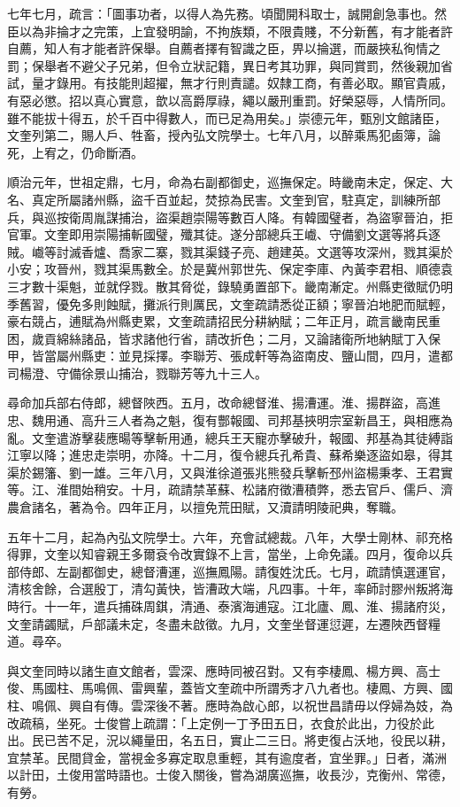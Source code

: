 \begin{pinyinscope}
七年七月，疏言：「圖事功者，以得人為先務。頃聞開科取士，誠開創急事也。然臣以為非掄才之完策，上宜發明諭，不拘族類，不限貴賤，不分新舊，有才能者許自薦，知人有才能者許保舉。自薦者擇有智識之臣，畀以掄選，而嚴挾私徇情之罰；保舉者不避父子兄弟，但令立狀記籍，異日考其功罪，與同賞罰，然後親加省試，量才錄用。有技能則超擢，無才行則責譴。奴隸工商，有善必取。顯官貴戚，有惡必懲。招以真心實意，歆以高爵厚祿，繩以嚴刑重罰。好榮惡辱，人情所同。雖不能拔十得五，於千百中得數人，而已足為用矣。」崇德元年，甄別文館諸臣，文奎列第二，賜人戶、牲畜，授內弘文院學士。七年八月，以醉乘馬犯鹵簿，論死，上宥之，仍命斷酒。

順治元年，世祖定鼎，七月，命為右副都御史，巡撫保定。時畿南未定，保定、大名、真定所屬諸州縣，盜千百並起，焚掠為民害。文奎到官，駐真定，訓練所部兵，與巡按衛周胤謀捕治，盜渠趙崇陽等數百人降。有韓國璧者，為盜寧晉泊，拒官軍。文奎即用崇陽捕斬國璧，殲其徒。遂分部總兵王巇、守備劉文選等將兵逐賊。巇等討滅香爐、喬家二寨，戮其渠錢子亮、趙建英。文選等攻深州，戮其渠於小安；攻晉州，戮其渠馬數全。於是冀州郭世先、保定李庫、內黃李君相、順德袁三才數十渠魁，並就俘戮。散其脅從，錄驍勇置部下。畿南漸定。州縣吏徵賦仍明季舊習，優免多則蝕賦，攤派行則厲民，文奎疏請悉從正額；寧晉泊地肥而賦輕，豪右競占，逋賦為州縣吏累，文奎疏請招民分耕納賦；二年正月，疏言畿南民重困，歲貢綿絲諸品，皆求諸他行省，請改折色；二月，又論諸衛所地納賦丁入保甲，皆當屬州縣吏：並見採擇。李聯芳、張成軒等為盜南皮、鹽山間，四月，遣都司楊澄、守備徐景山捕治，戮聯芳等九十三人。

尋命加兵部右侍郎，總督陜西。五月，改命總督淮、揚漕運。淮、揚群盜，高進忠、魏用通、高升三人者為之魁，復有酆報國、司邦基挾明宗室新昌王，與相應為亂。文奎遣游擊裴應暘等擊斬用通，總兵王天寵亦擊破升，報國、邦基為其徒縛詣江寧以降；進忠走崇明，亦降。十二月，復令總兵孔希貴、蘇希樂逐盜如皋，得其渠於錫籓、劉一雄。三年八月，又與淮徐道張兆熊發兵擊斬邳州盜楊秉孝、王君實等。江、淮間始稍安。十月，疏請禁革蘇、松諸府徵漕積弊，悉去官戶、儒戶、濟農倉諸名，著為令。四年正月，以擅免荒田賦，又瀆請明陵祀典，奪職。

五年十二月，起為內弘文院學士。六年，充會試總裁。八年，大學士剛林、祁充格得罪，文奎以知睿親王多爾袞令改實錄不上言，當坐，上命免議。四月，復命以兵部侍郎、左副都御史，總督漕運，巡撫鳳陽。請復姓沈氏。七月，疏請慎選運官，清核舍餘，合選殷丁，清勾黃快，皆漕政大端，凡四事。十年，率師討膠州叛將海時行。十一年，遣兵捕硃周錤，清通、泰濱海逋寇。江北廬、鳳、淮、揚諸府災，文奎請蠲賦，戶部議未定，冬盡未啟徵。九月，文奎坐督運愆遲，左遷陜西督糧道。尋卒。

與文奎同時以諸生直文館者，雲深、應時同被召對。又有李棲鳳、楊方興、高士俊、馬國柱、馬鳴佩、雷興輩，蓋皆文奎疏中所謂秀才八九者也。棲鳳、方興、國柱、鳴佩、興自有傳。雲深後不著。應時為啟心郎，以祝世昌請毋以俘婦為妓，為改疏稿，坐死。士俊嘗上疏謂：「上定例一丁予田五日，衣食於此出，力役於此出。民已苦不足，況以繩量田，名五日，實止二三日。將吏復占沃地，役民以耕，宜禁革。民間貸金，當視金多寡定取息重輕，其有逾度者，宜坐罪。」日者，滿洲以計田，土俊用當時語也。士俊入關後，嘗為湖廣巡撫，收長沙，克衡州、常德，有勞。


\end{pinyinscope}
